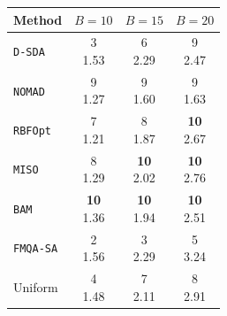 \begin{tabular}{@{}lccc@{}}\toprule
Method & \(B=10\) & \(B=15\) & \(B=20\)\\\midrule
\texttt{D-SDA} & \makecell{3\\1.53} & \makecell{6\\2.29} & \makecell{9\\2.47} \\
\texttt{NOMAD} & \makecell{9\\1.27} & \makecell{9\\1.60} & \makecell{9\\1.63} \\
\texttt{RBFOpt} & \makecell{7\\1.21} & \makecell{8\\1.87} & \makecell{\textbf{10}\\2.67} \\
\texttt{MISO} & \makecell{8\\1.29} & \makecell{\textbf{10}\\2.02} & \makecell{\textbf{10}\\2.76} \\
\texttt{BAM} & \makecell{\textbf{10}\\1.36} & \makecell{\textbf{10}\\1.94} & \makecell{\textbf{10}\\2.51} \\
\texttt{FMQA-SA} & \makecell{2\\1.56} & \makecell{3\\2.29} & \makecell{5\\3.24} \\
Uniform & \makecell{4\\1.48} & \makecell{7\\2.11} & \makecell{8\\2.91} \\
\bottomrule\end{tabular}
